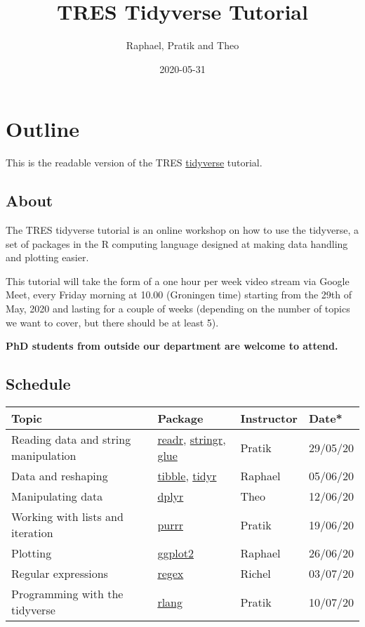 \documentclass[
]{book}
\title{TRES Tidyverse Tutorial}
\author{Raphael, Pratik and Theo}
\date{2020-05-31}
\begin{document}
\maketitle


\linenumbers

{
\setcounter{tocdepth}{1}
\tableofcontents
}
\hypertarget{outline}{%
\chapter*{Outline}\label{outline}}

This is the readable version of the TRES \href{https://www.tidyverse.org/}{tidyverse} tutorial.

\hypertarget{about}{%
\section*{About}\label{about}}

The TRES tidyverse tutorial is an online workshop on how to use the tidyverse, a set of packages in the R computing language designed at making data handling and plotting easier.

This tutorial will take the form of a one hour per week video stream via Google Meet, every Friday morning at 10.00 (Groningen time) starting from the 29th of May, 2020 and lasting for a couple of weeks (depending on the number of topics we want to cover, but there should be at least 5).

\textbf{PhD students from outside our department are welcome to attend.}

\hypertarget{schedule}{%
\section*{Schedule}\label{schedule}}

\begin{longtable}[]{@{}llll@{}}
\toprule
Topic & Package & Instructor & Date*\tabularnewline
\midrule
\endhead
Reading data and string manipulation & \href{https://readr.tidyverse.org/}{readr}, \href{https://stringr.tidyverse.org/}{stringr}, \href{https://github.com/tidyverse/glue}{glue} & Pratik & 29/05/20\tabularnewline
Data and reshaping & \href{https://tibble.tidyverse.org/}{tibble}, \href{https://tidyr.tidyverse.org/}{tidyr} & Raphael & 05/06/20\tabularnewline
Manipulating data & \href{https://dplyr.tidyverse.org/}{dplyr} & Theo & 12/06/20\tabularnewline
Working with lists and iteration & \href{https://purrr.tidyverse.org/}{purrr} & Pratik & 19/06/20\tabularnewline
Plotting & \href{https://ggplot2.tidyverse.org/}{ggplot2} & Raphael & 26/06/20\tabularnewline
Regular expressions & \href{https://stat.ethz.ch/R-manual/R-devel/library/base/html/regex.html}{regex} & Richel & 03/07/20\tabularnewline
Programming with the tidyverse & \href{https://rlang.r-lib.org/}{rlang} & Pratik & 10/07/20\tabularnewline
\bottomrule
\end{longtable}
\end{document}
